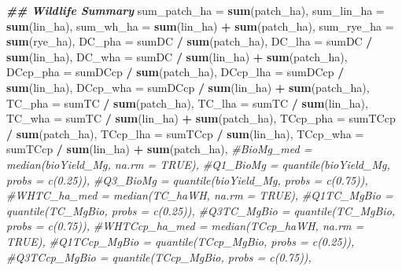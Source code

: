 \documentclass[
]{article}
\newenvironment{Shaded}{\begin{snugshade}}{\end{snugshade}}
\newcommand{\AttributeTok}[1]{\textcolor[rgb]{0.13,0.29,0.53}{#1}}
\newcommand{\CommentTok}[1]{\textcolor[rgb]{0.56,0.35,0.01}{\textit{#1}}}
\newcommand{\DocumentationTok}[1]{\textcolor[rgb]{0.56,0.35,0.01}{\textbf{\textit{#1}}}}
\newcommand{\FunctionTok}[1]{\textcolor[rgb]{0.13,0.29,0.53}{\textbf{#1}}}
\newcommand{\NormalTok}[1]{#1}
\newcommand{\SpecialCharTok}[1]{\textcolor[rgb]{0.81,0.36,0.00}{\textbf{#1}}}
\begin{document}
\begin{Shaded}
\begin{Highlighting}[]
            \DocumentationTok{\#\# Wildlife Summary}
            \AttributeTok{sum\_patch\_ha =} \FunctionTok{sum}\NormalTok{(patch\_ha),}
            \AttributeTok{sum\_lin\_ha =} \FunctionTok{sum}\NormalTok{(lin\_ha),}
            \AttributeTok{sum\_wh\_ha =} \FunctionTok{sum}\NormalTok{(lin\_ha) }\SpecialCharTok{+} \FunctionTok{sum}\NormalTok{(patch\_ha),}
            \AttributeTok{sum\_rye\_ha =} \FunctionTok{sum}\NormalTok{(rye\_ha),}
            \AttributeTok{DC\_pha =}\NormalTok{ sumDC }\SpecialCharTok{/} \FunctionTok{sum}\NormalTok{(patch\_ha),}
            \AttributeTok{DC\_lha =}\NormalTok{ sumDC }\SpecialCharTok{/} \FunctionTok{sum}\NormalTok{(lin\_ha),}
            \AttributeTok{DC\_wha =}\NormalTok{ sumDC }\SpecialCharTok{/} \FunctionTok{sum}\NormalTok{(lin\_ha) }\SpecialCharTok{+} \FunctionTok{sum}\NormalTok{(patch\_ha),}
            \AttributeTok{DCcp\_pha =}\NormalTok{ sumDCcp }\SpecialCharTok{/} \FunctionTok{sum}\NormalTok{(patch\_ha),}
            \AttributeTok{DCcp\_lha =}\NormalTok{ sumDCcp }\SpecialCharTok{/} \FunctionTok{sum}\NormalTok{(lin\_ha),}
            \AttributeTok{DCcp\_wha =}\NormalTok{ sumDCcp }\SpecialCharTok{/} \FunctionTok{sum}\NormalTok{(lin\_ha) }\SpecialCharTok{+} \FunctionTok{sum}\NormalTok{(patch\_ha),}
            \AttributeTok{TC\_pha =}\NormalTok{ sumTC }\SpecialCharTok{/} \FunctionTok{sum}\NormalTok{(patch\_ha),}
            \AttributeTok{TC\_lha =}\NormalTok{ sumTC }\SpecialCharTok{/} \FunctionTok{sum}\NormalTok{(lin\_ha),}
            \AttributeTok{TC\_wha =}\NormalTok{ sumTC }\SpecialCharTok{/} \FunctionTok{sum}\NormalTok{(lin\_ha) }\SpecialCharTok{+} \FunctionTok{sum}\NormalTok{(patch\_ha),}
            \AttributeTok{TCcp\_pha =}\NormalTok{ sumTCcp }\SpecialCharTok{/} \FunctionTok{sum}\NormalTok{(patch\_ha),}
            \AttributeTok{TCcp\_lha =}\NormalTok{ sumTCcp }\SpecialCharTok{/} \FunctionTok{sum}\NormalTok{(lin\_ha),}
            \AttributeTok{TCcp\_wha =}\NormalTok{ sumTCcp }\SpecialCharTok{/} \FunctionTok{sum}\NormalTok{(lin\_ha) }\SpecialCharTok{+} \FunctionTok{sum}\NormalTok{(patch\_ha),}
            \CommentTok{\#BioMg\_med = median(bioYield\_Mg, na.rm = TRUE),}
            \CommentTok{\#Q1\_BioMg = quantile(bioYield\_Mg, probs = c(0.25)),}
            \CommentTok{\#Q3\_BioMg = quantile(bioYield\_Mg, probs = c(0.75)),}
            \CommentTok{\#WHTC\_ha\_med = median(TC\_haWH, na.rm = TRUE),}
            \CommentTok{\#Q1TC\_MgBio = quantile(TC\_MgBio, probs = c(0.25)),}
            \CommentTok{\#Q3TC\_MgBio = quantile(TC\_MgBio, probs = c(0.75)),}
            \CommentTok{\#WHTCcp\_ha\_med = median(TCcp\_haWH, na.rm = TRUE),}
            \CommentTok{\#Q1TCcp\_MgBio = quantile(TCcp\_MgBio, probs = c(0.25)),}
            \CommentTok{\#Q3TCcp\_MgBio = quantile(TCcp\_MgBio, probs = c(0.75)),}
            

\end{Highlighting}
\end{Shaded}
\end{document}
